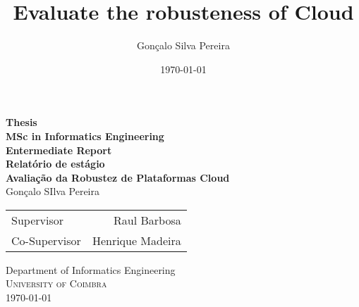 \begin{titlepage}

\begin{center}


\title{Evaluate the robusteness of Cloud}
\author{Gonçalo Silva Pereira}
\date{\today}


\textup{\small {\bf Thesis}}\\[0.3in]

\small{\bf MSc in Informatics Engineering}\\[0.3in]
\small{\bf Entermediate Report}\\[1.3in]

\Large 
\textbf {Relatório de estágio}\\[0.2in]
\textbf{Avaliação da Robustez de Plataformas Cloud}\\[1.5in]

\Large{Gonçalo SIlva Pereira}\\
\vspace{0.5cm}

\normalsize 
\begin{table}[h]
\centering
\begin{tabular}{lr}\hline
Supervisor     &  Raul Barbosa\\
Co-Supervisor  &  Henrique Madeira\\ \hline
\end{tabular}
\end{table}

\vspace{3cm}
\Large{Department of Informatics Engineering}\\
\normalsize
\textsc{University of Coimbra}
\vspace{0.2cm}\\


\dateenglish
\today

\end{center}
\end{titlepage}

